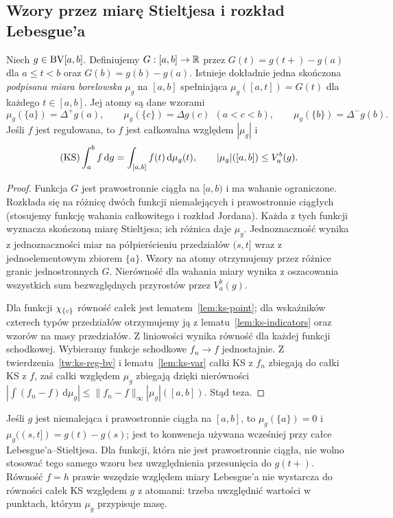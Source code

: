 \subsection*{Wzory przez miarę Stieltjesa i rozkład Lebesgue'a}
\begin{twierdzenie}
\label{tw:ks-measure}
Niech $g\in\mathrm{BV}[a,b]$. Definiujemy $G:[a,b]\to\mathbb R$ przez $G(t)=g(t+)-g(a)$ dla $a\le t<b$ oraz $G(b)=g(b)-g(a)$. Istnieje dokładnie jedna skończona \emph{podpisana miara borelowska} $\mu_g$ na $[a,b]$ spełniająca $\mu_g([a,t])=G(t)$ dla każdego $t\in[a,b]$. Jej atomy są dane wzorami
\[
 \mu_g(\{a\})=\Delta^+g(a),\qquad
 \mu_g(\{c\})=\Delta g(c)\ \ (a<c<b),\qquad
 \mu_g(\{b\})=\Delta^-g(b).
\]
Jeśli $f$ jest regulowana, to $f$ jest całkowalna względem $|\mu_g|$ i
\[
 (\mathrm{KS})\int_a^b f\,\mathrm dg=\int_{[a,b]}f(t)\,\mathrm d\mu_g(t),
 \qquad |\mu_g|([a,b])\le V_a^b(g).
\]
\end{twierdzenie}
\begin{proof}
Funkcja $G$ jest prawostronnie ciągła na $[a,b)$ i ma wahanie ograniczone. Rozkłada się na różnicę dwóch funkcji niemalejących i prawostronnie ciągłych (stosujemy funkcję wahania całkowitego i rozkład Jordana). Każda z tych funkcji wyznacza skończoną miarę Stieltjesa; ich różnica daje $\mu_g$. Jednoznaczność wynika z jednoznaczności miar na półpierścieniu przedziałów $(s,t]$ wraz z jednoelementowym zbiorem $\{a\}$. Wzory na atomy otrzymujemy przez różnice granic jednostronnych $G$. Nierówność dla wahania miary wynika z oszacowania wszystkich sum bezwzględnych przyrostów przez $V_a^b(g)$.

Dla funkcji $\chi_{\{c\}}$ równość całek jest lematem~\ref{lem:ks-point}; dla wskaźników czterech typów przedziałów otrzymujemy ją z lematu~\ref{lem:ks-indicators} oraz wzorów na masy przedziałów. Z liniowości wynika równość dla każdej funkcji schodkowej. Wybieramy funkcje schodkowe $f_n\to f$ jednostajnie. Z twierdzenia~\ref{tw:ks-reg-bv} i lematu~\ref{lem:ks-var} całki KS z $f_n$ zbiegają do całki KS z $f$, zaś całki względem $\mu_g$ zbiegają dzięki nierówności $|\int(f_n-f)\,\mathrm d\mu_g|\le\|f_n-f\|_\infty|\mu_g|([a,b])$. Stąd teza.
\end{proof}

\begin{uwaga}
Jeśli $g$ jest niemalejąca i prawostronnie ciągła na $[a,b]$, to $\mu_g(\{a\})=0$ i $\mu_g((s,t])=g(t)-g(s)$; jest to konwencja używana wcześniej przy całce Lebesgue'a--Stieltjesa. Dla funkcji, która nie jest prawostronnie ciągła, nie wolno stosować tego samego wzoru bez uwzględnienia przesunięcia do $g(t+)$. Równość $f=h$ prawie wszędzie względem miary Lebesgue'a nie wystarcza do równości całek KS względem $g$ z atomami: trzeba uwzględnić wartości w punktach, którym $\mu_g$ przypisuje masę.
\end{uwaga}

